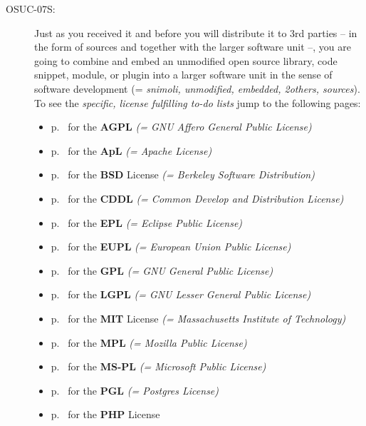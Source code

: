 \begin{description}
\item[OSUC-07S:]\label{OSUC-07S-DEF} Just as you received it and before you will
distribute it to 3rd parties -- in the form of sources and together with the
larger software unit --, you are going to combine and embed an unmodified open
source library, code snippet, module, or plugin into a larger software unit in
the sense of software development (= \textit{snimoli, unmodified, embedded,
2others, sources}). To see the \textit{specific, license fulfilling to-do lists}
jump to the following pages:
   \begin{itemize}
    \item p.\ \pageref{OSUC-07S-AGPL} for the \textbf{AGPL}
      \textit{(= GNU Affero General Public License)} 
    \item p.\ \pageref{OSUC-07S-Apache20} for the \textbf{ApL}
      \textit{(= Apache License)}
    \item p.\ \pageref{OSUC-07S-BSD} for the \textbf{BSD} License
      \textit{(= Berkeley Software Distribution)}
    \item p.\ \pageref{OSUC-07S-CDDL} for the \textbf{CDDL}
      \textit{(= Common Develop and Distribution License)}  
    \item p.\ \pageref{OSUC-07S-EPL} for the \textbf{EPL}
      \textit{(= Eclipse Public License)}     
    \item p.\ \pageref{OSUC-07S-EUPL} for the \textbf{EUPL}
      \textit{(= European Union Public License)} 
    \item p.\ \pageref{OSUC-07S-GPL} for the \textbf{GPL}
       \textit{(= GNU General Public License)} 
    \item p.\ \pageref{OSUC-07S-LGPL} for the \textbf{LGPL}
      \textit{(= GNU Lesser General Public License)}           
    \item p.\ \pageref{OSUC-07S-MIT} for the \textbf{MIT} License
       \textit{(= Massachusetts Institute of Technology)} 
    \item p.\ \pageref{OSUC-07S-MPL} for the \textbf{MPL}
      \textit{(= Mozilla Public License)}     
    \item p.\ \pageref{OSUC-07S-MS-PL} for the \textbf{MS-PL}
      \textit{(= Microsoft Public License)} 
    \item p.\ \pageref{OSUC-07S-PGL} for the \textbf{PGL}
      \textit{(= Postgres License)} 
    \item p.\ \pageref{OSUC-07S-PHP} for the \textbf{PHP} License 
  \end{itemize}


\end{description}
